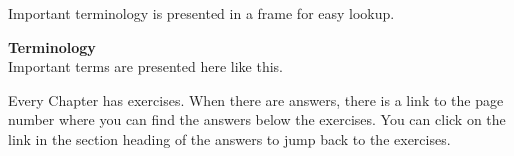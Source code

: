 
Important terminology is presented in a frame for easy lookup.
\begin{shaded*}
\textbf{Terminology}\\
Important terms are presented here like this.
\end{shaded*}

Every Chapter has exercises. When there are answers, there is a link to the page
number where you can find the answers below the exercises. You can click on the
link in the section heading of the answers to jump back to the exercises.



